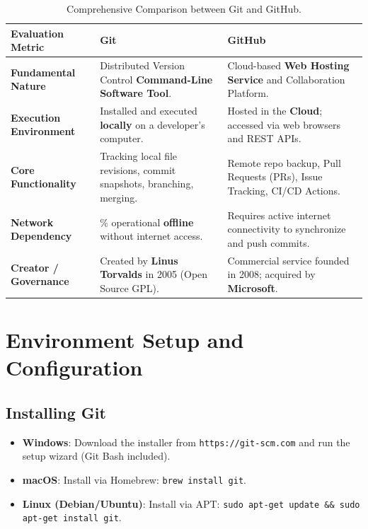 \begin{table}[htbp]
\centering
\small
\renewcommand{\arraystretch}{1.3}
\begin{tabularx}{\linewidth}{l>{\raggedright\arraybackslash}X>{\raggedright\arraybackslash}X}
\toprule
\textbf{Evaluation Metric} & \textbf{Git} & \textbf{GitHub} \\
\midrule
\textbf{Fundamental Nature} & Distributed Version Control \textbf{Command-Line Software Tool}. & Cloud-based \textbf{Web Hosting Service} and Collaboration Platform. \\
\textbf{Execution Environment} & Installed and executed \textbf{locally} on a developer's computer. & Hosted in the \textbf{Cloud}; accessed via web browsers and REST APIs. \\
\textbf{Core Functionality} & Tracking local file revisions, commit snapshots, branching, merging. & Remote repo backup, Pull Requests (PRs), Issue Tracking, CI/CD Actions. \\
\textbf{Network Dependency} & 100\% operational \textbf{offline} without internet access. & Requires active internet connectivity to synchronize and push commits. \\
\textbf{Creator / Governance} & Created by \textbf{Linus Torvalds} in 2005 (Open Source GPL). & Commercial service founded in 2008; acquired by \textbf{Microsoft}. \\
\bottomrule
\end{tabularx}
\caption{Comprehensive Comparison between Git and GitHub.}
\label{tab:git-vs-github-master}
\end{table}

\section{Environment Setup and Configuration}

\subsection{Installing Git}
\begin{itemize}[leftmargin=1.5em]
    \item \textbf{Windows}: Download the installer from \texttt{https://git-scm.com} and run the setup wizard (Git Bash included).
    \item \textbf{macOS}: Install via Homebrew: \texttt{brew install git}.
    \item \textbf{Linux (Debian/Ubuntu)}: Install via APT: \texttt{sudo apt-get update \&\& sudo apt-get install git}.
\end{itemize}


